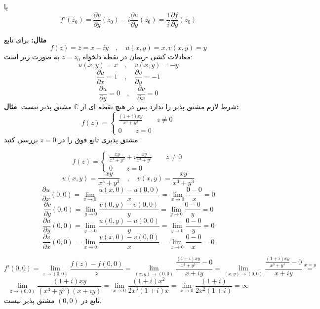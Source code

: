 \documentclass[12pt]{report}
\begin{document}
 	 	 	  یا
 	 	 	  $$f'(z_0) = \frac{\partial v}{\partial y}(z_0) - i\frac{\partial u}{\partial y}(z_0) = \frac{1}{i}\frac{\partial f}{\partial y}(z_0)$$
 	 	 	  
 	 	 	  \textbf{مثال:}
 	 	 	  برای تابع
 	 	 	  $$f(z) = \bar{z} = x - iy \quad, \quad u(x, y) = x , v(x, y) = y$$
 	 	 	  معادلات  کشی -ریمان در نقطه دلخواه 
 	 	 	  $z=z_0$
 	 	 	  به صورت زیر است:
 	 	 	  $$u(x, y) = x \quad,\quad v(x, y) = -y$$
 	 	 	  $$\frac{\partial u}{\partial x}=1 \quad, \quad\frac{\partial v}{\partial y} = -1$$
 	 	 	  $$\frac{\partial u}{\partial y} = 0\quad , \quad \frac{\partial v}{\partial x} = 0$$
 	 	 	  شرط لازم مشتق پذیر را ندارد پس در هیچ نقطه ای از 
 	 	 	  $\mathbb{C}$
 	 	 	  مشتق پذیر نیست.
 	 	 	  \textbf{مثال:}
 	 	 	  \[
 	 	 	  f(z) = 
 	 	 	  \begin{cases}
 	 	 	  	\frac{(1+i)xy}{x^3+y^3} \qquad z \neq 0\\
 	 	 	  	0 \qquad z = 0
 	 	 	  \end{cases}
 	 	 	  \]
 	 	 	  مشتق پذیری تابع فوق را در 
 	 	 	  $z=0$
 	 	 	  بررسی کنید.
 	 	 	  
 	 	 	  \[
 	 	 	  f(z) = 
 	 	 	  \begin{cases}
 	 	 	  	\frac{xy}{x^3+y^3} + i \frac{xy}{x^3+y^3} \qquad z \neq 0\\
 	 	 	  	0 \qquad z = 0
 	 	 	  \end{cases}
 	 	 	  \]
 	 	 	  $$u(x, y) = \frac{xy}{x^3+y^3} \quad , \quad v(x, y) = \frac{xy}{x^3+y^3}$$
 	 	 	  $$\frac{\partial u}{\partial x}(0, 0) = \lim_{x \to 0} \frac{u(x, 0) - u(0,0)}{x} = \lim_{x \to 0} \frac{0 - 0}{x} = 0$$
 	 	 	  $$\frac{\partial v}{\partial y}(0, 0) = \lim_{y \to 0} \frac{v(0, y) - v(0,0)}{y} = \lim_{y \to 0} \frac{0 - 0}{y} = 0$$
 	 	 	  $$\frac{\partial u}{\partial y}(0, 0) = \lim_{y \to 0} \frac{u(0, y) - u(0,0)}{y} = \lim_{y \to 0} \frac{0 - 0}{y} = 0$$
 	 	 	  $$\frac{\partial v}{\partial x}(0, 0) = \lim_{x \to 0} \frac{v(x, 0) - v(0,0)}{x} = \lim_{x \to 0} \frac{0 - 0}{x} = 0$$
 	 	 	  
 	 	 	  $$f'(0,0) = \lim_{z \to (0,0)} \frac{f(z) - f(0, 0)}{z} = \lim_{(x, y) \to (0, 0)} \frac{\frac{(1+i)xy}{x^3+y^3} - 0}{x+iy} = \lim_{(x, y) \to (0, 0)} \frac{\frac{(1+i)xy}{x^3+y^3} - 0}{x+iy} \overset{x=y}{=}$$
 	 	 	  $$\lim_{z \to (0,0)} \frac{(1+i)xy}{(x^3+y^3)(x+iy)} = \lim_{x \to 0} \frac{(1 + i) x^2}{2x^3(1+i)x} = \lim_{x \to 0} \frac{(1+i)}{2x^2(1+i)} = \infty$$
 	 	 	  تابع در 
 	 	 	  $(0,0)$
 	 	 	  مشتق پذیر نیست.
 	 	 	  
\end{document}
